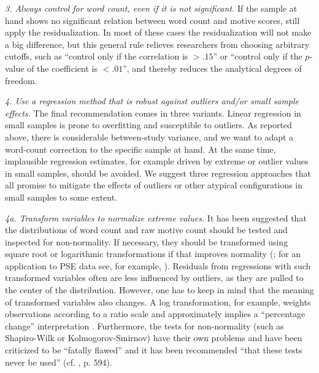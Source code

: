 \documentclass[man,a4paper,mask]{apa6}
\begin{document}
{\emph{3. Always control for word count, even if it is not significant.} If the sample at hand shows no significant relation between word count and motive scores, still apply the residualization. In most of these cases the residualization will not make a big difference, but this general rule relieves researchers from choosing arbitrary cutoffs, such as ``control only if the correlation is $> .15$'' or ``control only if the $p$-value of the coefficient is $<.01$'', and thereby reduces the analytical degrees of freedom.


\emph{4. Use a regression method that is robust against outliers and/or small sample effects.}
The final recommendation comes in three variants. Linear regression in small samples is prone to overfitting and susceptible to outliers. As reported above, there is considerable between-study variance, and we want to adapt a word-count correction to the specific sample at hand. At the same time, implausible regression estimates, for example driven by extreme or outlier values in small samples, should be avoided. We suggest three regression approaches that all promise to mitigate the effects of outliers or other atypical configurations in small samples to some extent.

\emph{4a. Transform variables to normalize extreme values.} It has been suggested that the distributions of word count and raw motive count should be tested and inspected for non-normality. If necessary, they should be transformed using square root or logarithmic transformations if that improves normality (; for an application to PSE data see, for example, ). Residuals from regressions with such transformed variables often are less influenced by outliers, as they are pulled to the center of the distribution. However, one has to keep in mind that the meaning of transformed variables also changes. A log transformation, for example, weights observations according to a ratio scale and approximately implies a ``percentage change'' interpretation \parencite{keene_LogTransformationSpecial_1995}. Furthermore, the tests for non-normality (such as Shapiro-Wilk or Kolmogorov-Smirnov) have their own problems and have been criticized to be ``fatally flawed'' and it has been recommended ``that these tests never be used'' (cf. , p. 594).

}
\end{document}
